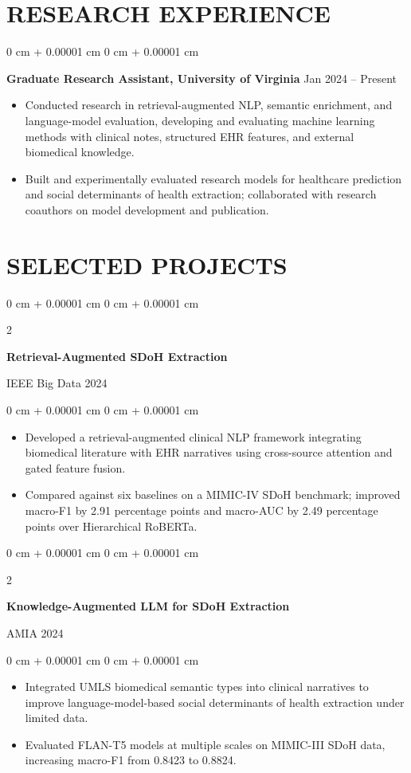 \documentclass[10pt, letterpaper]{article}
\newenvironment{highlights}{
    \begin{itemize}[
        topsep=0.03 cm,
        parsep=0.03 cm,
        partopsep=0pt,
        itemsep=0pt,
        leftmargin=0 cm + 10pt
    ]
}{
    \end{itemize}
} %
\newenvironment{onecolentry}{
    \begin{adjustwidth}{
        0 cm + 0.00001 cm
    }{
        0 cm + 0.00001 cm
    }
}{
    \end{adjustwidth}
} %
\newenvironment{twocolentry}[2][]{
    \onecolentry
    \def\secondColumn{#2}
    \setcolumnwidth{\fill, 4.5 cm}
    \begin{paracol}{2}
}{
    \switchcolumn \raggedleft \secondColumn
    \end{paracol}
    \endonecolentry
} %
\begin{document}
\section{RESEARCH EXPERIENCE}
\begin{onecolentry}
\textbf{Graduate Research Assistant, University of Virginia} \hfill Jan 2024 -- Present
\begin{highlights}
\item Conducted research in retrieval-augmented NLP, semantic enrichment, and language-model evaluation, developing and evaluating machine learning methods with clinical notes, structured EHR features, and external biomedical knowledge.
\item Built and experimentally evaluated research models for healthcare prediction and social determinants of health extraction; collaborated with research coauthors on model development and publication.
\end{highlights}
\end{onecolentry}
\section{SELECTED PROJECTS}

\begin{twocolentry}{IEEE Big Data 2024}
\textbf{Retrieval-Augmented SDoH Extraction}
\end{twocolentry}
\begin{onecolentry}
\begin{highlights}
\item Developed a retrieval-augmented clinical NLP framework integrating biomedical literature with EHR narratives using cross-source attention and gated feature fusion.
\item Compared against six baselines on a MIMIC-IV SDoH benchmark; improved macro-F1 by 2.91 percentage points and macro-AUC by 2.49 percentage points over Hierarchical RoBERTa.
\end{highlights}
\end{onecolentry}
\vspace{0.06 cm}

\begin{twocolentry}{AMIA 2024}
\textbf{Knowledge-Augmented LLM for SDoH Extraction}
\end{twocolentry}
\begin{onecolentry}
\begin{highlights}
\item Integrated UMLS biomedical semantic types into clinical narratives to improve language-model-based social determinants of health extraction under limited data.
\item Evaluated FLAN-T5 models at multiple scales on MIMIC-III SDoH data, increasing macro-F1 from 0.8423 to 0.8824.
\end{highlights}
\end{onecolentry}
\vspace{0.06 cm}
\end{document}
